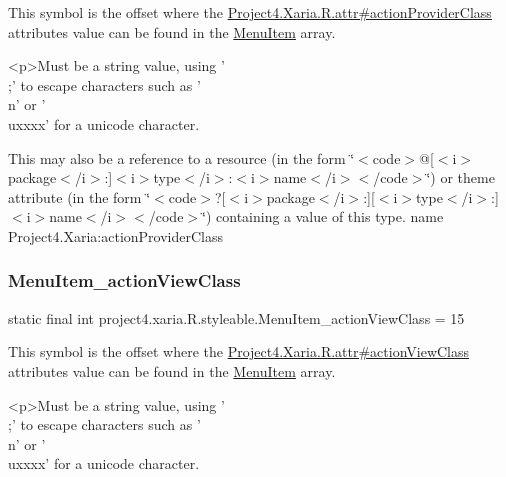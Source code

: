 This symbol is the offset where the \hyperlink{}{Project4.\+Xaria.\+R.\+attr\#action\+Provider\+Class} attribute\textquotesingle{}s value can be found in the \hyperlink{classproject4_1_1xaria_1_1R_1_1styleable_a8a573827fcaba6497e560662224b5530}{Menu\+Item} array.

\begin{DoxyVerb}      <p>Must be a string value, using '\\;' to escape characters such as '\\n' or '\\uxxxx' for a unicode character.
\end{DoxyVerb}
 

This may also be a reference to a resource (in the form \char`\"{}$<$code$>$@\mbox{[}$<$i$>$package$<$/i$>$\+:\mbox{]}$<$i$>$type$<$/i$>$\+:$<$i$>$name$<$/i$>$$<$/code$>$\char`\"{}) or theme attribute (in the form \char`\"{}$<$code$>$?\mbox{[}$<$i$>$package$<$/i$>$\+:\mbox{]}\mbox{[}$<$i$>$type$<$/i$>$\+:\mbox{]}$<$i$>$name$<$/i$>$$<$/code$>$\char`\"{}) containing a value of this type.  name Project4.\+Xaria\+:action\+Provider\+Class \mbox{\label{classproject4_1_1xaria_1_1R_1_1styleable_a7bbb347655e3e3a9ddf30dbb7bcc6a18}} 
\subsubsection{\texorpdfstring{Menu\+Item\+\_\+action\+View\+Class}{MenuItem\_actionViewClass}}
{\footnotesize\ttfamily static final int project4.\+xaria.\+R.\+styleable.\+Menu\+Item\+\_\+action\+View\+Class = 15\hspace{0.3cm}{\ttfamily [static]}}

This symbol is the offset where the \hyperlink{}{Project4.\+Xaria.\+R.\+attr\#action\+View\+Class} attribute\textquotesingle{}s value can be found in the \hyperlink{classproject4_1_1xaria_1_1R_1_1styleable_a8a573827fcaba6497e560662224b5530}{Menu\+Item} array.

\begin{DoxyVerb}      <p>Must be a string value, using '\\;' to escape characters such as '\\n' or '\\uxxxx' for a unicode character.
\end{DoxyVerb}
 

